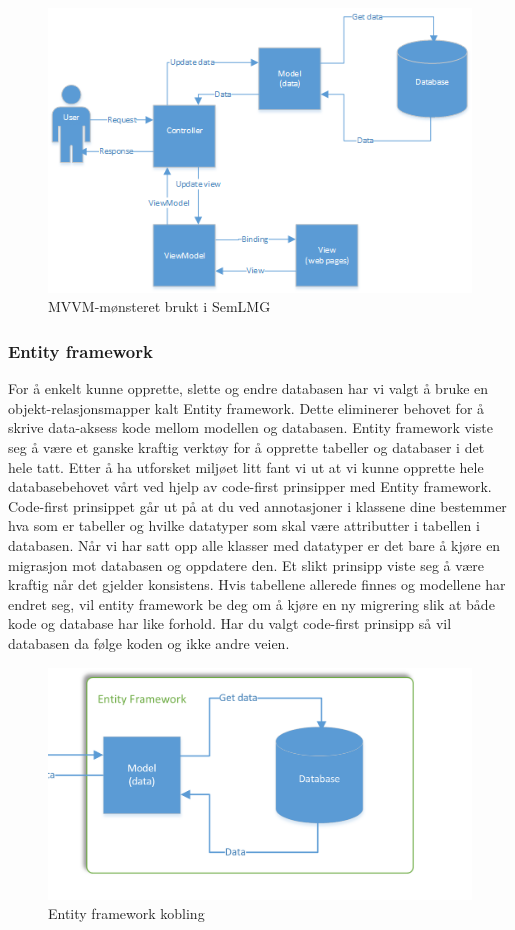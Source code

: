 \begin{figure}[H]
\centering
\includegraphics[width=14cm]{images/mvvm}
\caption{MVVM-mønsteret brukt i SemLMG}
\label{fig:mvvm}
\end{figure}

\newpage
\subsubsection{Entity framework}
For å enkelt kunne opprette, slette og endre databasen har vi valgt å bruke en objekt-relasjonsmapper kalt Entity framework. Dette eliminerer behovet for å skrive data-aksess kode mellom modellen og databasen. Entity framework viste seg å være et ganske kraftig verktøy for å opprette tabeller og databaser i det hele tatt. Etter å ha utforsket miljøet litt fant vi ut at vi kunne opprette hele databasebehovet vårt ved hjelp av code-first prinsipper med Entity framework. Code-first prinsippet går ut på at du ved annotasjoner i klassene dine bestemmer hva som er tabeller og hvilke datatyper som skal være attributter i tabellen i databasen. Når vi har satt opp alle klasser med datatyper er det bare å kjøre en migrasjon mot databasen og oppdatere den. Et slikt prinsipp viste seg å være kraftig når det gjelder konsistens. Hvis tabellene allerede finnes og modellene har endret seg, vil entity framework be deg om å kjøre en ny migrering slik at både kode og database har like forhold. Har du valgt code-first prinsipp så vil databasen da følge koden og ikke andre veien.
\begin{figure}[H]
\centering
\includegraphics[width=14cm]{images/EntityFramework}
\caption{Entity framework kobling}
\label{fig:entityframework}
\end{figure}
